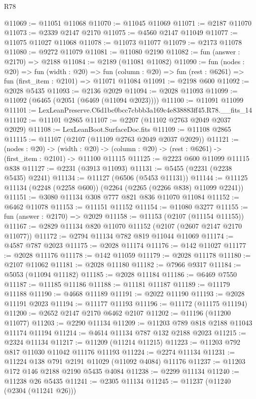 \begin{lexlean}{R78}
\begin{coremodule}
@11069 := @11051 @11068
@11070 := @11045 @11069
@11071 := @2187 @11070
@11073 := @2339 @2147 @2170
@11075 := @4560 @2147 @11049
@11077 := @11075 @11027 @11068
@11078 := @11073 @11077
@11079 := @2173 @11078
@11080 := @9272 @11079
@11081 := @11080 @2190
@11082 := fun (answer : @2170) => @2188
@11084 := @2189 (@11081 @11082)
@11090 := fun (nodes : @20) =>
  fun (width : @20) =>
  fun (column : @20) => fun (rest : @6261) => fun (first_item : @2101) => @11071 @11084
@11091 := @2198 @600
@11092 := @2028 @5435
@11093 := @2136 @2029
@11094 := @2028 @11093
@11099 := @11092 (@6465 (@2051 (@6469 (@11094 @2023))))
@11100 := @11091 @11099
@11101 := LexLeanPreserve.C6d1bc0bcc7cbbb3a169c4e838883ff45.R78.__fits_14
@11102 := @11101 @2865
@11107 := @2207 (@11102 @2763 @2049 @2037 @2029)
@11108 := LexLeanBoot.SurfaceDoc.fits
@11109 := @11108 @2865
@11115 := @11107 (@2107 (@11109 @2763 @2049 @2037 @2029))
@11121 := (nodes : @20) ->
  (width : @20) -> (column : @20) -> (rest : @6261) -> (first_item : @2101) -> @11100 @11115
@11125 := @2223 @600 @11099 @11115 @838
@11127 := @2231 (@3913 @11093)
@11131 := @5455 (@2231 (@2238 @5435) @2241)
@11134 := @11127 (@6506 (@5453 @11131))
@11144 := @11125 @11134 (@2248 (@2258 @600)) (@2264 (@2265 (@2266 @838) @11099 @2241))
@11151 := @3080 @11134 @308 @777 @821 @836 @11070 @11084
@11152 := @6462 @11078
@11153 := @11151 @11152
@11154 := @11080 @3277
@11155 := fun (answer : @2170) => @2029
@11158 := @11153 (@2107 (@11154 @11155))
@11167 := @2829 @11134 @820 @11070 @11152 (@2107 (@2607 @2147 @2170 @11077))
@11172 := @2794 @11134 @782 @819 @11044 @11069
@11174 := @4587 @787 @2023
@11175 := @2028 @11174
@11176 := @142 @11027
@11177 := @2028 @11176
@11178 := @142 @11059
@11179 := @2028 @11178
@11180 := @2107 @11062
@11181 := @2028 @11180
@11182 := @7966 @9317
@11184 := @5053 (@11094 @11182)
@11185 := @2028 @11184
@11186 := @6469 @7550
@11187 := @11185 @11186
@11188 := @11181 @11187
@11189 := @11179 @11188
@11190 := @4668 @11189
@11191 := @2022 @11190
@11193 := @2028 @11191 @2023
@11194 := @11177 @11193
@11196 := @11172 (@11175 @11194)
@11200 := @2652 @2147 @2170 @6462 @2107
@11202 := @11196 (@11200 @11077)
@11203 := @2290 @11134
@11209 := @11203 @789 @818 @2188 @11043 @11174 @11194
@11214 := @4614 @11134 @787 @132 @2188 @2023
@11215 := @2324 @11134
@11217 := @11209 (@11214 @11215)
@11223 := @11203 @792 @817 @11030 @11042 @11176 @11193
@11224 := @2274 @11134
@11231 := @11224 @138 @791 @2191 @11029 (@11092 @4084) @11176
@11237 := @11203 @172 @146 @2188 @2190 @5435 @4084
@11238 := @2299 @11134
@11240 := @11238 @26 @5435
@11241 := @2305 @11134
@11245 := @11237 (@11240 (@2304 (@11241 @26)))

\end{coremodule}
\end{lexlean}
